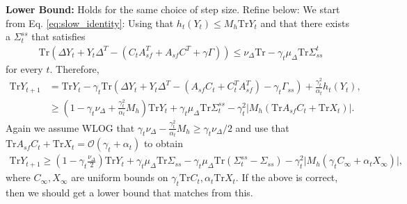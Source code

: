 \textbf{Lower Bound:} Holds for the same choice of step size. {\color{red}Refine below:}
We start from Eq. \eqref{eq:slow_identity}: Using that $h_t (Y_t) \leq M_h \mathrm{Tr} Y_t$ and that there exists a $\Sigma_t^{ss}$ that satisfies
\begin{align*}
    \mathrm{Tr}\left( \Delta Y_t + Y_t \Delta^T - (C_t A_{sf}^T + A_{sf} C^T + \gamma \Gamma)\right)
    \leq \nu_\Delta \mathrm{Tr} - \gamma_t \mu_\Delta \mathrm{Tr} \Sigma^t_{ss} 
\end{align*}
for every $t$.
Therefore,
\begin{align*}
    \mathrm{Tr}Y_{t+1} &= \mathrm{Tr} Y_t - \gamma_t \mathrm{Tr}\left(\Delta Y_t 
    + Y_t \Delta^T - (A_{sf} C_t + C_t^T A_{sf}^T) - \gamma_t \Gamma_{ss}  \right)
    + \frac{\gamma_t^2}{\alpha_t} h_t (Y_t) ,   
    \\ &
    \geq \left(1 - \gamma_t \nu_\Delta + \frac{\gamma_t^2}{\alpha_t} M_h \right) \mathrm{Tr} Y_t
    + \gamma_t \mu_\Delta \mathrm{Tr} \Sigma^{ss}_t 
    -  \gamma_t^2 \lvert M_h \left(\mathrm{Tr} A_{sf} C_t + \mathrm{Tr} X_t\right) \rvert .
\end{align*}
Again we assume WLOG that $\gamma_t \nu_\Delta - \frac{\gamma_t^2}{\alpha_t} M_h \geq \gamma_t \nu_\Delta / 2$ and use that $\mathrm{Tr} A_{sf} C_t + \mathrm{Tr} X_t = \mathcal{O}(\gamma_t + \alpha_t)$ to obtain
\begin{align*}
    \mathrm{Tr} Y_{t+1} \geq \left(1 - \gamma_t \frac{\nu_\Delta}{2}\right) \mathrm{Tr} Y_t + \gamma_t \mu_\Delta \mathrm{Tr} \Sigma_{ss}
    - \gamma_t \mu_\Delta \mathrm{Tr}(\Sigma_t^{ss} -  \Sigma_{ss}) - \gamma_t^2 \lvert M_h (\gamma_t C_\infty + \alpha_t X_\infty) \rvert ,
\end{align*}
where $C_\infty, X_\infty$ are uniform bounds on $\gamma_t \mathrm{Tr} C_t, \alpha_t \mathrm{Tr} X_t$.
{\color{red}If the above is correct, then we should get a lower bound that matches from this. }
